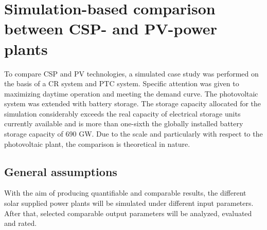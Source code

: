 \chapter{Simulation-based comparison between CSP- and PV-power plants}
To compare CSP and PV technologies, a simulated case study was performed on the basis of a CR system and PTC system. 
Specific attention was given to maximizing daytime operation and meeting the demand curve. 
The photovoltaic system was extended with battery storage. 
The storage capacity allocated for the simulation considerably exceeds the real capacity of electrical storage units currently available and is more than one-sixth the globally installed battery storage capacity of 690 GW.\cite{IEA2015}
Due to the scale and particularly with respect to the photovoltaic plant, the comparison is theoretical in nature.
\pagebreak
\section{General assumptions}
With the aim of producing quantifiable and comparable results, the different solar supplied power plants will be simulated under different input  parameters. After that, selected comparable output parameters will be analyzed, evaluated and rated.

